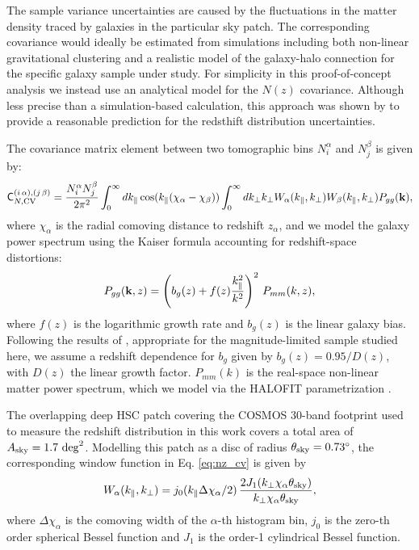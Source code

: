 \documentclass[a4paper,11pt]{article}
\begin{document}
        The sample variance uncertainties are caused by the fluctuations in the matter density traced by galaxies in the particular sky patch. The corresponding covariance would ideally be estimated from simulations including both non-linear gravitational clustering and a realistic model of the galaxy-halo connection for the specific galaxy sample under study. For simplicity in this proof-of-concept analysis we instead use an analytical model for the $N(z)$ covariance. Although less precise than a simulation-based calculation, this approach was shown by \cite{2004.09542} to provide a reasonable prediction for the redsthift distribution uncertainties.

        The covariance matrix element between two tomographic bins $N^\alpha_i$ and $N^\beta_j$ is given by:
        \begin{equation}\label{eq:nz_cv}
          {\sf C}_{N,{\rm CV}}^{(i\,\alpha),(j\,\beta)}=\frac{N^\alpha_iN^\beta_j}{2\pi^2} \int_0^\infty dk_\parallel \cos(k_\parallel(\chi_\alpha-\chi_\beta))\int_0^\infty dk_\perp k_\perp W_\alpha(k_\parallel,k_\perp)W_\beta(k_\parallel,k_\perp)P_{gg}({\bf k}),
        \end{equation}
        where $\chi_\alpha$ is the radial comoving distance to redshift $z_\alpha$, and we model the galaxy power spectrum using the Kaiser formula \cite{1987MNRAS.227....1K} accounting for redshift-space distortions:
        \begin{equation}
          P_{gg}({\bf k},z)=\left(b_g(z)+f(z)\frac{k_\parallel^2}{k^2}\right)^2\,P_{mm}(k,z),
        \end{equation}
        where $f(z)$ is the logarithmic growth rate and $b_g(z)$ is the linear galaxy bias. Following the results of \cite{1912.08209}, appropriate for the magnitude-limited sample studied here, we assume a redshift dependence for $b_g$ given by $b_g(z) = 0.95/D(z)$, with $D(z)$ the linear growth factor. $P_{mm}(k)$ is the real-space non-linear matter power spectrum, which we model via the HALOFIT parametrization \cite{2003MNRAS.341.1311S,2012ApJ...761..152T}.

        The overlapping deep HSC patch covering the COSMOS 30-band footprint used to measure the redshift distribution in this work covers a total area of $A_{\rm sky} = 1.7 \ {\rm deg}^2$. Modelling this patch as a disc of radius $\theta_{\rm sky}=0.73^\circ$, the corresponding window function in Eq. \ref{eq:nz_cv} is given by
        \begin{equation}
          W_\alpha(k_\parallel,k_\perp)=j_0(k_\parallel\Delta\chi_\alpha/2)\,\frac{2 J_1(k_\perp \chi_\alpha\theta_{\rm sky})}{k_\perp \chi_\alpha\theta_{\rm sky}},
        \end{equation}
        where $\Delta\chi_\alpha$ is the comoving width of the $\alpha$-th histogram bin, $j_0$ is the zero-th order spherical Bessel function and $J_1$ is the order-1 cylindrical Bessel function.
\end{document}
